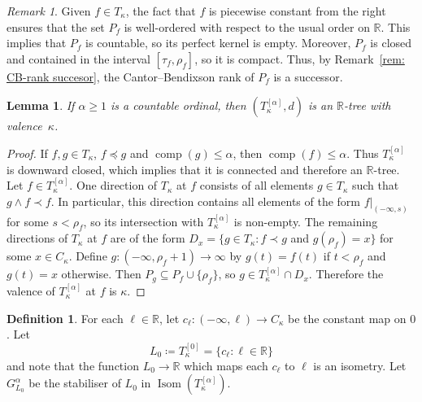 \documentclass[11pt]{article}
\DeclareMathOperator{\Isom}{Isom}
\DeclareMathOperator{\comp}{comp}
\newtheorem{lemma}[theorem]{Lemma}
\theoremstyle{definition}
\newtheorem{definition}[theorem]{Definition}
\theoremstyle{remark}
\newtheorem{remark}[theorem]{Remark}
\begin{document}
\begin{remark} 
Given $f \in T_\kappa$, the fact that $f$ is piecewise constant from the right ensures that the set $P_f$ is well-ordered with respect to the usual order on $\mathbb{R}$. This implies that $P_f$ is countable, so its perfect kernel is empty. Moreover, $P_f$ is closed and contained in the interval $[\tau_f, \rho_f]$, so it is compact. Thus, by Remark~\ref{rem: CB-rank succesor}, the Cantor--Bendixson rank of $P_f$ is a successor.
\end{remark}

\begin{lemma} \label{lem: incomplete r-tree}
    If $\alpha \geq 1$ is a countable ordinal, then $(T_\kappa^{[\alpha]}, d)$ is an $\mathbb{R}$-tree with valence~$\kappa$.
\end{lemma}
\begin{proof}
    If $f,g \in T_\kappa$, $f \preceq g$ and $\comp(g) \leq \alpha$, then $\comp(f) \leq \alpha$. Thus $T_\kappa^{[\alpha]}$ is downward closed, which implies that it is connected and therefore an $\mathbb{R}$-tree. Let $f \in T_\kappa^{[\alpha]}$. One direction of $T_\kappa$ at $f$ consists of all elements $g \in T_\kappa$ such that $g \wedge f \prec f$. In particular, this direction contains all elements of the form $f|_{(-\infty,s)}$ for some $s < \rho_f$, so its intersection with $T_\kappa^{[\alpha]}$ is non-empty. The remaining directions of $T_\kappa$ at $f$ are of the form $D_x = \{g \in T_\kappa : f \prec g$ and $g(\rho_f) = x\}$ for some $x \in C_\kappa$. Define $g: (- \infty, \rho_f + 1) \rightarrow \infty$ by $g(t) = f(t)$ if $t < \rho_f$ and $g(t) = x$ otherwise. Then $P_g \subseteq P_f \cup \{\rho_f\}$, so $g \in T_\kappa^{[\alpha]} \cap D_x$. Therefore the valence of $T_\kappa^{[\alpha]}$ at $f$ is $\kappa$.
\end{proof}

\begin{definition}
    For each $\ell \in \mathbb{R}$, let $c_\ell: (-\infty,\ell) \rightarrow C_\kappa$ be the constant map on $0$. Let 
    \[
        L_0 \coloneqq T_\kappa^{[0]} = \{c_\ell : \ell \in \mathbb{R}\}
    \]
    and note that the function $L_0 \rightarrow \mathbb{R}$ which maps each $c_\ell$ to $\ell$ is an isometry. Let $G^\alpha_{L_0}$ be the stabiliser of $L_0$ in $\Isom(T_\kappa^{[\alpha]})$.
\end{definition}
\end{document}
